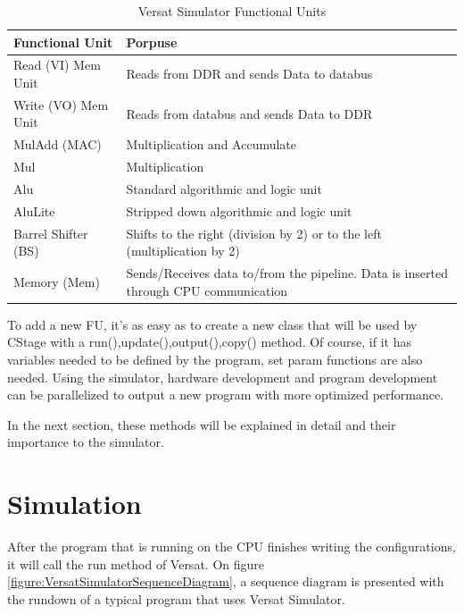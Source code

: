 \begin{table}[!htbp]
    \centering
    \begin{tabular}{|ll|}
        \hline
        \textbf{Functional Unit}     & \textbf{Porpuse}  \\  \hline
        Read (VI) Mem Unit             & Reads from DDR and sends Data to databus            \\ \hline
        Write (VO) Mem Unit & Reads from databus and sends Data to DDR             \\ \hline
        MulAdd (MAC)    & Multiplication and Accumulate          \\ \hline
		Mul    & Multiplication     \\ \hline
		Alu    & Standard algorithmic and logic unit     \\ \hline
		AluLite    & Stripped down  algorithmic and logic unit     \\ \hline
		Barrel Shifter (BS) & Shifts to the right (division by 2) or to the left (multiplication by 2) \\ \hline
		Memory (Mem) & Sends/Receives data to/from the pipeline. Data is inserted through CPU communication   \\ \hline
        \end{tabular}
    \caption{Versat Simulator Functional Units}
    \label{table:versatsimfu}
    \end{table}

To add a new FU, it's as easy as to create a new class that will be used by CStage with
a run(),update(),output(),copy() method. Of course, if it has variables needed to be defined
by the program, set param functions are also needed. Using the simulator, hardware development
and program development can be parallelized to output a new program 
with more optimized performance.

In the next section, these methods will be explained in detail and 
their importance to the simulator.

\section{Simulation}

After the program that is running on the CPU finishes writing the configurations, it will call the run method of Versat.
On figure \ref{figure:VersatSimulatorSequenceDiagram}, a sequence diagram is presented with the rundown
of a typical program that uses Versat Simulator.

